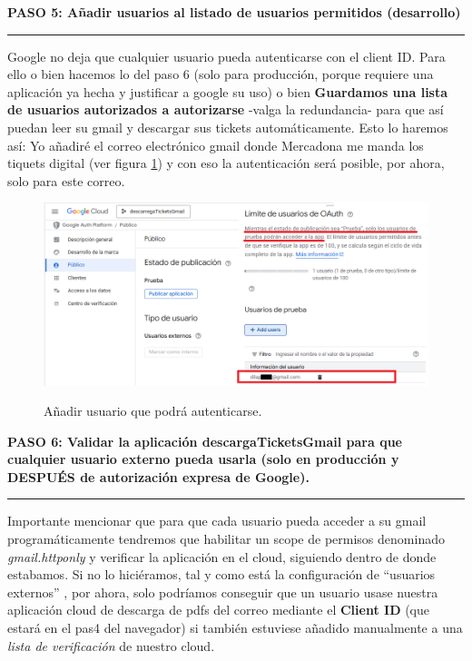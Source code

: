 \documentclass[a4paper,12pt]{report}
\begin{document}
	
	
	\noindent \textbf{PASO 5: Añadir usuarios al listado de usuarios permitidos (desarrollo)}
	\vspace{.1em}
	\hrule
	\vspace{.5em}
	
	Google no deja que cualquier usuario pueda autenticarse con el client ID. Para ello o bien hacemos lo del paso 6 (solo para producción, porque requiere una aplicación ya hecha y justificar a google su uso) o bien \textbf{Guardamos una lista de usuarios autorizados a autorizarse} -valga la redundancia- para que así puedan leer su gmail y descargar sus tickets automáticamente. Esto lo haremos así: Yo añadiré el correo electrónico gmail donde Mercadona me manda los tiquets digital (ver figura \ref{fig:googleCloudB}) y con eso la autenticación será posible, por ahora, solo para este correo.
	
	\FloatBarrier
	\setlength{\belowcaptionskip}{3pt}
	\begin{figure}[H]
		\centering
		\caption{Añadir usuario que podrá autenticarse.}
		\includegraphics[width=1\linewidth]{img/googleCloudB}
		\label{fig:googleCloudB}
	\end{figure}
	\FloatBarrier
	
	
	
	
	
	
	
	\noindent \textbf{PASO 6: Validar la aplicación descargaTicketsGmail para que cualquier usuario externo pueda usarla (solo en producción y DESPUÉS de autorización expresa de Google).}
	\vspace{.1em}
	\hrule
	\vspace{.5em}
	
	
		Importante mencionar que para que cada usuario pueda acceder a su gmail programáticamente tendremos que habilitar un scope de permisos denominado \textit{gmail.httponly} y verificar la aplicación en el cloud, siguiendo dentro de donde estabamos. Si no lo hiciéramos, tal y como está la configuración de ``usuarios externos'' , por ahora, solo podríamos conseguir que un usuario usase nuestra aplicación cloud de descarga de pdfs del correo mediante el \textbf{Client ID} (que estará en el pas4 del navegador) si también estuviese añadido manualmente a una \textit{lista de verificación} de nuestro cloud.
		
\end{document}
